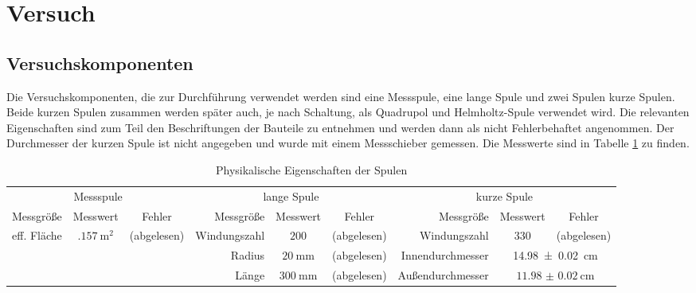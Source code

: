 \section{Versuch}
\subsection{Versuchskomponenten}
Die Versuchskomponenten, die zur Durchführung verwendet werden sind eine Messspule, eine lange Spule und zwei Spulen kurze Spulen. Beide kurzen Spulen zusammen werden später auch, je nach Schaltung, als Quadrupol und Helmholtz-Spule verwendet wird. Die relevanten Eigenschaften sind zum Teil den Beschriftungen der Bauteile zu entnehmen und werden dann als nicht Fehlerbehaftet angenommen. Der Durchmesser der kurzen Spule ist nicht angegeben und wurde mit einem Messschieber gemessen. Die Messwerte sind in Tabelle \ref{tab:eigenschaftenSpulen} zu finden.
\begin{landscape}
\begin{table}
\thispagestyle{plain}
\begin{tabular}{r|cc||r|cc||r|cc}
	\multicolumn{3}{c}{Messspule} & \multicolumn{3}{c}{lange Spule} & \multicolumn{3}{c}{kurze Spule} \\
	Messgröße & Messwert & Fehler & Messgröße & Messwert & Fehler & Messgröße & Messwert & Fehler \\ \hline
	eff. Fläche & $ \SI{.157}{\square\meter} $ & (abgelesen) & Windungszahl & $ 200 $ & (abgelesen) & Windungszahl & 330 & (abgelesen) \\
	& & & Radius & $ \SI{20}{\milli\meter} $ & (abgelesen) & Innendurchmesser & \multicolumn{2}{c}{\SI{14.98(2)}{\centi\meter}} \\
	& & & Länge & $ \SI{300}{\milli\meter} $ & (abgelesen) & Außendurchmesser & \multicolumn{2}{c}{$ \SI{11.98(2)}{\centi\meter} $}	
\end{tabular}
\label{tab:eigenschaftenSpulen}
\caption{Physikalische Eigenschaften der Spulen}
\end{table}
\end{landscape}

